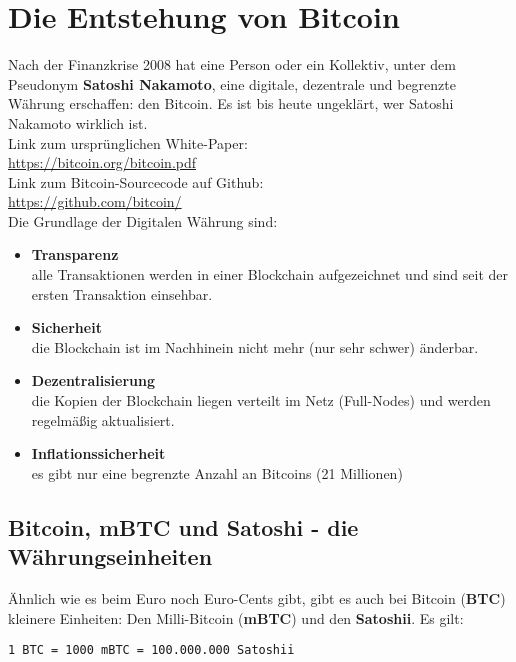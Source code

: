 \documentclass[10pt,a4paper,titlepage]{paper}
\begin{document}
\section{Die Entstehung von Bitcoin}
Nach der Finanzkrise 2008 hat eine Person oder ein Kollektiv, unter dem Pseudonym \textbf{Satoshi Nakamoto}, eine digitale, dezentrale und begrenzte Währung erschaffen: den Bitcoin. Es ist bis heute ungeklärt, wer Satoshi Nakamoto wirklich ist.\vspace{.3cm}\\
Link zum ursprünglichen White-Paper:\\
\href{https://bitcoin.org/bitcoin.pdf}{\color{blue}https://bitcoin.org/bitcoin.pdf}\vspace{.3cm}\\
Link zum Bitcoin-Sourcecode auf Github:\\
\href{https://github.com/bitcoin/}{\color{blue}https://github.com/bitcoin/} \vspace{.3cm}\\
Die Grundlage der Digitalen Währung sind:
\begin{itemize}
\item \textbf{Transparenz}\\alle Transaktionen werden in einer Blockchain aufgezeichnet und sind seit der ersten Transaktion einsehbar.
\item \textbf{Sicherheit}\\die Blockchain ist im Nachhinein nicht mehr (nur sehr schwer) änderbar.
\item \textbf{Dezentralisierung}\\die Kopien der Blockchain liegen verteilt im Netz (Full-Nodes) und werden regelmäßig aktualisiert.
\item \textbf{Inflationssicherheit}\\es gibt nur eine begrenzte Anzahl an Bitcoins (21 Millionen)  
\end{itemize} 

\subsection{Bitcoin, mBTC und Satoshi - die Währungseinheiten}
Ähnlich wie es beim Euro noch Euro-Cents gibt, gibt es auch bei Bitcoin (\textbf{BTC}) kleinere Einheiten: Den Milli-Bitcoin (\textbf{mBTC}) und den \textbf{Satoshii}. Es gilt:
\begin{center}
\verb|1 BTC = 1000 mBTC = 100.000.000 Satoshii|
\end{center} 
\end{document}

